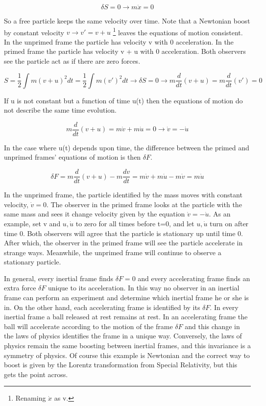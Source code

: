 \begin{equation}
\delta S = 0 \rightarrow m\ddot{x} = 0
\end{equation}

So a free particle keeps the same velocity over time. Note that a Newtonian boost by constant velocity $v \rightarrow v' = v + u$ \footnote{Renaming $\dot{x}$ as v.} leaves the equations of motion consistent. In the unprimed frame the particle has velocity v with 0 acceleration. In the primed frame the particle has velocity v + u with 0 acceleration. Both observers see the particle act as if there are zero forces.

\begin{equation}
S = \frac{1}{2} \int m(v + u)^2 dt  =  \frac{1}{2} \int m(v')^2 dt \rightarrow \delta S = 0 \rightarrow m\frac{d}{dt}(v+u) = m\frac{d}{dt}(v') = 0 
\end{equation}

If u is not constant but a function of time u(t) then the equations of motion do not describe the same time evolution.

\begin{equation}
m\frac{d}{dt}(v+u) = m\dot{v} + m\dot{u} = 0 \rightarrow \dot{v} = -\dot{u}
\end{equation}

In the case where u(t) depends upon time, the difference between the primed and unprimed frames' equations of motion is then $\delta F$.

\begin{equation}
\delta F = m\frac{d}{dt}(v+u) - m\frac{dv}{dt} = m\dot{v} + m\dot{u} - m\dot{v} = m\dot{u}
\end{equation}

In the unprimed frame, the particle identified by the mass moves with constant velocity, $\dot{v} = 0$. The observer in the primed frame looks at the particle with the same mass and sees it change velocity given by the equation $\dot{v} = -\dot{u}$. As an example, set v and $u, \dot{u}$ to zero for all times before t=0, and let $u, \dot{u}$ turn on after time 0. Both observers will agree that the particle is stationary up until time 0. After which, the observer in the primed frame will see the particle accelerate in strange ways. Meanwhile, the unprimed frame will continue to observe a stationary particle. 

In general, every inertial frame finds $\delta F = 0$ and every accelerating frame finds an extra force $\delta F$ unique to its acceleration. In this way no observer in an inertial frame can perform an experiment and determine which inertial frame he or she is in. On the other hand, each accelerating frame is identified by its $\delta F$.  In every inertial frame a ball released at rest remains at rest. In an accelerating frame the ball will accelerate according to the motion of the frame $\delta F$ and this change in the laws of physics identifies the frame in a unique way. Conversely, the laws of physics remain the same boosting between inertial frames, and this invariance is a symmetry of physics. Of course this example is Newtonian and the correct way to boost is given by the Lorentz transformation from Special Relativity, but this gets the point across.

